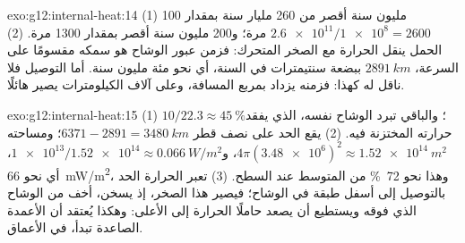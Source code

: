 \begin{solution}{exo:g12:internal-heat:14}
(1) 100 مليون سنة أقصر من 260 مليار سنة بمقدار $\num{2.6e11}/\num{1e8} = 2600$
مرة؛ و200 مليون سنة أقصر بمقدار 1300 مرة.
(2) الحمل ينقل الحرارة مع الصخر المتحرك: فزمن عبور
الوشاح هو سمكه مقسومًا على السرعة، $\qty{2891}{km}$ ببضعة
سنتيمترات في السنة، أي نحو مئة مليون سنة. أما التوصيل فلا ناقل له
كهذا: فزمنه يزداد بمربع المسافة، وعلى آلاف
الكيلومترات يصير هائلًا.
\end{solution}

\begin{solution}{exo:g12:internal-heat:15}
(1) $10/22.3 \approx \qty{45}{\percent}$؛ والباقي تبرد
الوشاح نفسه، الذي يفقد حرارته المختزنة فيه. (2) يقع الحد على نصف قطر $6371 - 2891 =
\qty{3480}{km}$؛ ومساحته $4\pi (\num{3.48e6})^2 \approx
\qty{1.52e14}{m^2}$، و$\num{1e13}/\num{1.52e14} \approx
\qty{0.066}{W/m^2}$، أي نحو \qty{66}{mW/m^2}، وهذا نحو \qty{72}{\percent} من
المتوسط عند السطح. (3) تعبر الحرارة الحد بالتوصيل إلى
أسفل طبقة في الوشاح؛ فيصير هذا الصخر، إذ يسخن، أخف من
الوشاح الذي فوقه ويستطيع أن يصعد حاملًا الحرارة إلى الأعلى: وهكذا يُعتقد أن الأعمدة
الصاعدة تبدأ، في الأعماق.
\end{solution}

